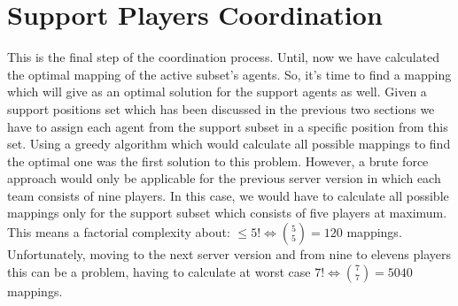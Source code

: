 \section{Support Players Coordination}
This is the final step of the coordination process. Until, now we have calculated the optimal mapping of the active subset's agents. So, it's time to find a mapping which will give as an optimal solution for the support agents as well. Given a support positions set which has been discussed in the previous two sections we have to assign each agent from the support subset in a specific position from this set. Using a greedy algorithm which would calculate all possible mappings to find the optimal one was the first solution to this problem. However, a brute force approach would only be applicable for the previous server version in which each team consists of nine players. In this case, we would have to calculate all possible mappings only for the support subset which consists of five players at maximum. 
This means a factorial complexity about: $\leqslant 5! \Leftrightarrow  {{5}\choose{5}} = 120$ mappings. Unfortunately, moving to the next server version and from nine to elevens players this can be a problem, having to calculate at worst case $ 7! \Leftrightarrow  {{7}\choose{7}} = 5040$ mappings. 

